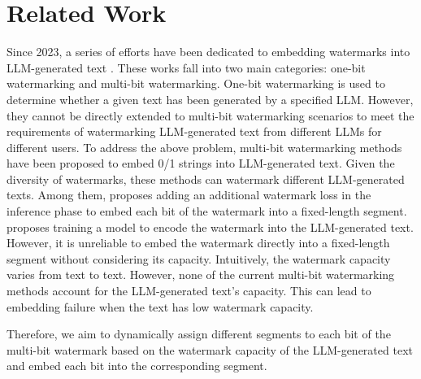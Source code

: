 \section{Related Work}
Since 2023, a series of efforts have been dedicated to embedding watermarks into LLM-generated text \cite{liu2024survey}. These works fall into two main categories: one-bit watermarking and multi-bit watermarking.
One-bit watermarking is used to determine whether a given text has been generated by a specified LLM.
However, they cannot be directly extended to multi-bit watermarking scenarios to meet the requirements of watermarking LLM-generated text from different LLMs for different users.
To address the above problem, multi-bit watermarking methods have been proposed to embed 0/1 strings into LLM-generated text. Given the diversity of watermarks, these methods can watermark different LLM-generated texts. Among them, \cite{WangYC0LM0024} proposes adding an additional watermark loss in the inference phase to embed each bit of the watermark into a fixed-length segment. \cite{zhang2024remark} proposes training a model to encode the watermark into the LLM-generated text. However, it is unreliable to embed the watermark directly into a fixed-length segment without considering its capacity. Intuitively, the watermark capacity varies from text to text. However, none of the current multi-bit watermarking methods account for the LLM-generated text's capacity. This can lead to embedding failure when the text has low watermark capacity.



Therefore, we aim to dynamically assign different segments to each bit of the multi-bit watermark based on the watermark capacity of the LLM-generated text and embed each bit into the corresponding segment.

